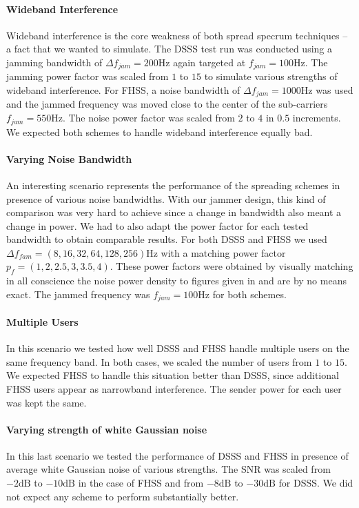 	\paragraph{Wideband Interference}
	Wideband interference is the core weakness of both spread specrum techniques -- a fact that we wanted to simulate. The DSSS test run was conducted using a jamming bandwidth of $\Delta f_{jam} = 200\text{Hz}$ again targeted at $f_{jam} = 100\text{Hz}$. The jamming power factor was scaled from $1$ to $15$ to simulate various strengths of wideband interference. For FHSS, a noise bandwidth of $\Delta f_{jam} = 1000\text{Hz}$  was used and the jammed frequency was moved close to the center of the sub-carriers $f_{jam} = 550\text{Hz}$. The noise power factor was scaled from $2$ to $4$ in $0.5$ increments. We expected both schemes to handle wideband interference equally bad.
	
	\paragraph{Varying Noise Bandwidth}	
	An interesting scenario represents the performance of the spreading schemes in presence of various noise bandwidths. With our jammer design, this kind of comparison was very hard to achieve since a change in bandwidth also meant a change in power. We had to also adapt the power factor for each tested bandwidth to obtain comparable results. For both DSSS and FHSS we used $\Delta f_{fam} = (8,16,32,64,128,256)\text{Hz}$ with a matching power factor $p_f = (1,2,2.5,3,3.5,4)$. These power factors were obtained by visually matching in all conscience the noise power density to figures given in \cite{ISS} and are by no means exact. The jammed frequency was $f_{jam}=100\text{Hz}$ for both schemes. 
	
	\paragraph{Multiple Users}
	In this scenario we tested how well DSSS and FHSS handle multiple users on the same frequency band. In both cases, we scaled the number of users from $1$ to $15$. We expected FHSS to handle this situation better than DSSS, since additional FHSS users appear as narrowband interference. The sender power for each user was kept the same.
	
	\paragraph{Varying strength of white Gaussian noise}
	In this last scenario we tested the performance of DSSS and FHSS in presence of average white Gaussian noise of various strengths. The SNR was scaled from $-2\text{dB}$ to $-10\text{dB}$ in the case of FHSS and from $-8\text{dB}$ to $-30\text{dB}$ for DSSS. We did not expect any scheme to perform substantially better.
	
	
	